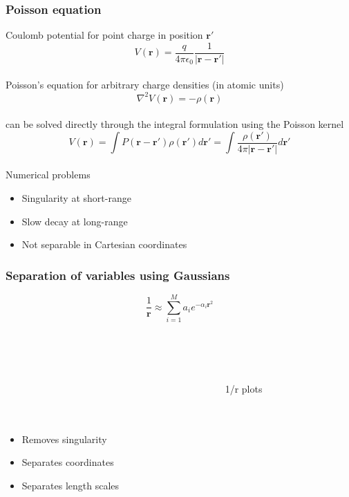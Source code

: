 \documentclass[mathserif]{beamer}
\begin{document}
\begin{frame}
    \frametitle{Poisson equation}
    Coulomb potential for point charge in position $\boldsymbol{r}'$
    \begin{equation}
    	\nonumber
    	V(\boldsymbol{r}) = \frac{q}{4\pi\epsilon_0}
    	\frac{1}{|\boldsymbol{r}-\boldsymbol{r'}|}
    \end{equation}
    \ \\
    Poisson's equation for arbitrary charge densities (in atomic units)
    \begin{equation}
	\nonumber
    	\nabla^2 V(\boldsymbol{r}) = -\rho(\boldsymbol{r})
    \end{equation}
    \ \\
    can be solved directly through the integral formulation using the Poisson kernel
    \begin{equation}
	\nonumber
	V(\boldsymbol{r}) = 
	\int P(\boldsymbol{r}-\boldsymbol{r'})\rho(\boldsymbol{r'}) d\boldsymbol{r'} =
	\int\frac{\rho(\boldsymbol{r'})}{4\pi|\boldsymbol{r} - \boldsymbol{r'}|} d\boldsymbol{r'} 
    \end{equation}
    \ \\
    Numerical problems
    \begin{itemize}
	\item Singularity at short-range
	\item Slow decay at long-range
	\item Not separable in Cartesian coordinates
    \end{itemize}
\end{frame}

\begin{frame}
    \frametitle{Separation of variables using Gaussians}
    \begin{equation}
	\nonumber
	\frac{1}{\boldsymbol{r}} \approx \sum_{i=1}^M a_i e^{-\alpha_i \boldsymbol{r}^2} 
    \end{equation}
    \ \\
    \ \\
    \ \\
    \begin{columns}
    \begin{column}{.48\textwidth}
    \ \\
    \ \\
    \ \\
    \begin{itemize}
	\item	Removes singularity
	\item	Separates coordinates
	\item	Separates length scales
    \end{itemize}
    \end{column}
    \begin{column}{.48\textwidth}
	1/r plots
    \end{column}
    \end{columns}    
\end{frame}
\end{document}
